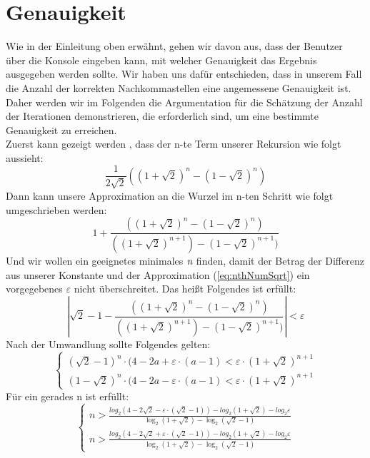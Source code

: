 \documentclass[course=erap]{aspdoc}
\begin{document}
\section{Genauigkeit}
Wie in der Einleitung oben erwähnt, gehen wir davon aus, dass der Benutzer über die Konsole eingeben kann, mit welcher Genauigkeit das Ergebnis ausgegeben werden sollte. Wir haben uns dafür entschieden, dass in unserem Fall die Anzahl der korrekten Nachkommastellen eine angemessene Genauigkeit ist. Daher werden wir im Folgenden die Argumentation für die Schätzung der Anzahl der Iterationen demonstrieren, die erforderlich sind, um eine bestimmte Genauigkeit zu erreichen.\\ 
Zuerst kann gezeigt werden \cite{Primzahlen}, dass der n-te Term unserer Rekursion wie folgt aussieht:
\begin{equation}\label{eq:nthNum}
\frac{1}{2\sqrt{2}}((1+\sqrt{2})^n-(1-\sqrt{2})^n)
\end{equation}
Dann kann unsere Approximation an die Wurzel im n-ten Schritt wie folgt umgeschrieben werden:
\begin{equation}\label{eq:nthNumSqrt}
1+\frac{((1+\sqrt{2})^n-(1-\sqrt{2})^n)}{((1+\sqrt{2})^{n+1})-(1-\sqrt{2})^{n+1})}
\end{equation}
Und wir wollen ein geeignetes minimales $\emph{n}$ finden, damit der Betrag der Differenz aus unserer Konstante und der Approximation (\ref{eq:nthNumSqrt}) ein vorgegebenes $\varepsilon$ nicht überschreitet. Das heißt Folgendes ist erfüllt:
\begin{equation}\label{eq:errAprx}
|\sqrt{2}-1-\frac{((1+\sqrt{2})^n-(1-\sqrt{2})^n)}{((1+\sqrt{2})^{n+1})-(1-\sqrt{2})^{n+1})}|<\varepsilon
\end{equation}
Nach der Umwandlung sollte Folgendes gelten:
\begin{equation*}\label{eq:error2} 
\begin{cases} 
(\sqrt{2}-1)^n\cdot(4-2a+\varepsilon\cdot(a-1)<\varepsilon\cdot(1+\sqrt{2})^{n+1}
\\ (1-\sqrt{2})^n\cdot(4-2a-\varepsilon\cdot(a-1)<\varepsilon\cdot(1+\sqrt{2})^{n+1}
\end{cases}
\end{equation*}
Für ein gerades n ist erfüllt:
\begin{equation}\label{eq:errorLog} 
\begin{cases} 
n>\frac{log_2{(4-2\sqrt{2}-\varepsilon\cdot(\sqrt{2}-1))}-log_2{(1+\sqrt{2})}-log_2{\varepsilon}}{\log_2{(1+\sqrt{2})-\log_2{(\sqrt{2}-1)}}}
\\ n>\frac{log_2{(4-2\sqrt{2}+\varepsilon\cdot(\sqrt{2}-1))}-log_2{(1+\sqrt{2})}-log_2{\varepsilon}}{\log_2{(1+\sqrt{2})-\log_2{(\sqrt{2}-1)}}}
\end{cases}
\end{equation}
\end{document}
